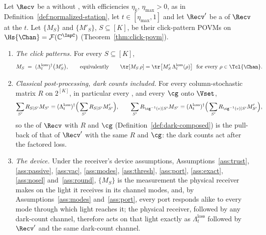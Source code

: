 \begin{proposition}\label{prop:efficiency-normalization}
Let $\Recv$ be a  without
, with efficiencies $\eta_k$,
$\eta_{\max}>0$, as in Definition~\ref{def:normalized-station}, let
$t\in[\eta_{\max},1]$ and let $\Recv'$ be a  of
$\Recv$ at the  $t$. Let $\{M_S\}$ and $\{M'_S\}$,
$S\subseteq[K]$, be their click-pattern POVMs on
$\Hs{\Chan}=\mathcal{F}(\mathbb{C}^{\InpC})$ (Theorem~\ref{thm:click-povm}).
\begin{enumerate}[label=(\roman*),leftmargin=3.0em]
\item \emph{The click patterns.} For every $S\subseteq[K]$,
  \begin{equation}\label{eq:normalization}
    M_S\;=\;(\Lambda^{\mathrm{loss}}_t)^{\dagger}\big(M'_S\big),
    \qquad\text{equivalently}\qquad
    \tr[M_S\,\rho]=\tr\big[M'_S\,\Lambda^{\mathrm{loss}}_t(\rho)\big]
    \ \ \text{for every }\rho\in\Tcl{\Chan}.
  \end{equation}
\item \emph{Classical post-processing, dark counts included.} For every
  column-stochastic matrix $R$ on $2^{[K]}$, in particular every
  , and every  $\cg$
  onto $\Vset$,
  \begin{equation}\label{eq:normalizationdark}
    \sum_{S'}R_{S|S'}M_{S'}=(\Lambda^{\mathrm{loss}}_t)^{\dagger}
    \Big(\sum_{S'}R_{S|S'}M'_{S'}\Big),
    \qquad
    \sum_{S'}R_{\cg^{-1}(v)|S'}M_{S'}=(\Lambda^{\mathrm{loss}}_t)^{\dagger}
    \Big(\sum_{S'}R_{\cg^{-1}(v)|S'}M'_{S'}\Big),
  \end{equation}
  so the  of $\Recv$ with $R$ and $\cg$
  (Definition~\ref{def:dark-composed}) is the pull-back of that of $\Recv'$
  with the same $R$ and $\cg$: the dark counts act after the factored loss.
\item \emph{The device.} Under the receiver's device assumptions,
  Assumptions~\ref{ass:trust}, \ref{ass:passive}, \ref{ass:vac},
  \ref{ass:modes}, \ref{ass:thresh}, \ref{ass:port}, \ref{ass:exact},
  \ref{ass:nosel} and~\ref{ass:round}, $\{M_S\}$ is the measurement the
  physical receiver makes on the light it receives in its channel modes, and,
  by Assumptions~\ref{ass:modes} and~\ref{ass:port}, every port responds
  alike to every mode through which light reaches it; the physical receiver,
  followed by any dark-count channel, therefore acts on that light exactly as
  $\Lambda^{\mathrm{loss}}_t$ followed by $\Recv'$ and the same dark-count
  channel.
\end{enumerate}
\end{proposition}

